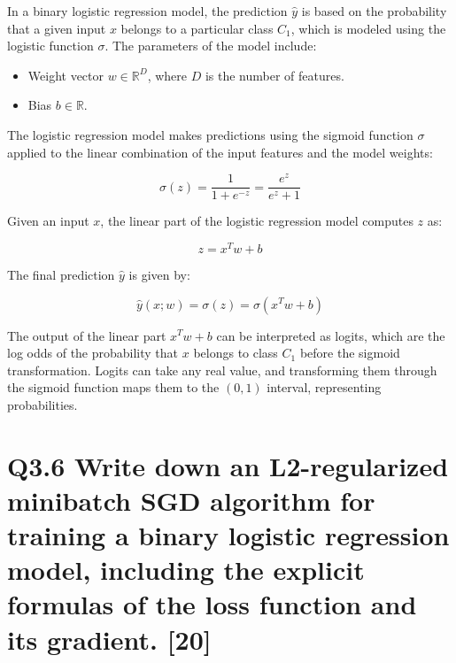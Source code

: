 \documentclass[11pt]{article}
\begin{document}
In a binary logistic regression model, the prediction \( \hat{y} \) is based on the probability that a given input \( x \) belongs to a particular class \( C_1 \), which is modeled using the logistic function \( \sigma \). The parameters of the model include:

\begin{itemize}
    \item Weight vector \( w \in \mathbb{R}^D \), where \( D \) is the number of features.
    \item Bias \( b \in \mathbb{R} \).
\end{itemize}

The logistic regression model makes predictions using the sigmoid function \( \sigma \) applied to the linear combination of the input features and the model weights:

\[
\sigma(z) = \frac{1}{1 + e^{-z}} = \frac{e^z}{e^z + 1}
\]

Given an input \( x \), the linear part of the logistic regression model computes \( z \) as:

\[
z = x^T w + b
\]

The final prediction \( \hat{y} \) is given by:

\[
\hat{y}(x; w) = \sigma(z) = \sigma(x^T w + b)
\]

The output of the linear part \( x^T w + b \) can be interpreted as logits, which are the log odds of the probability that \( x \) belongs to class \( C_1 \) before the sigmoid transformation. Logits can take any real value, and transforming them through the sigmoid function maps them to the \((0, 1)\) interval, representing probabilities.

\section{Q3.6 Write down an L2-regularized minibatch SGD algorithm for training a binary logistic regression model, including the explicit formulas of the loss function and its gradient. [20]}
\end{document}

